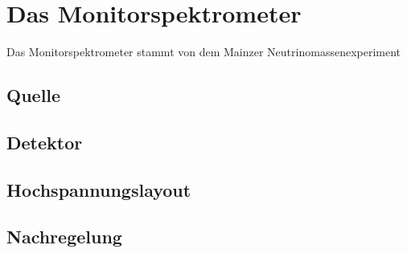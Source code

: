 
\chapter{Das Monitorspektrometer}
\label{ch:Monitorspektrometer}

Das Monitorspektrometer stammt von dem Mainzer Neutrinomassenexperiment


\section{Quelle}
\label{ch:Monitorspektrometer:sec:Quelle}

\section{Detektor}
\label{ch:Monitorspektrometer:sec:Detektor}


\section{Hochspannungslayout}
\label{ch:Monitorspektrometer:sec:Hochspannungslayout}


\section{Nachregelung}


